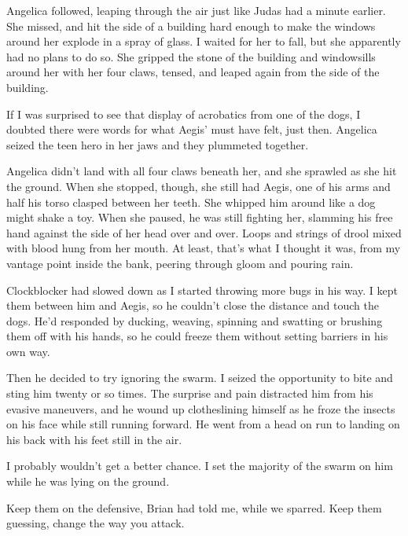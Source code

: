 Angelica followed, leaping through the air just like Judas had a minute earlier.  She missed, and hit the side of a building hard enough to make the windows around her explode in a spray of glass.  I waited for her to fall, but she apparently had no plans to do so.  She gripped the stone of the building and windowsills around her with her four claws, tensed, and leaped again from the side of the building.



If I was surprised to see that display of acrobatics from one of the dogs, I doubted there were words for what Aegis' must have felt, just then.  Angelica seized the teen hero in her jaws and they plummeted together.



Angelica didn't land with all four claws beneath her, and she sprawled as she hit the ground.  When she stopped, though, she still had Aegis, one of his arms and half his torso clasped between her teeth.  She whipped him around like a dog might shake a toy.  When she paused, he was still fighting her, slamming his free hand against the side of her head over and over.  Loops and strings of drool mixed with blood hung from her mouth.  At least, that's what I thought it was, from my vantage point inside the bank, peering through gloom and pouring rain.



Clockblocker had slowed down as I started throwing more bugs in his way.  I kept them between him and Aegis, so he couldn't close the distance and touch the dogs.  He'd responded by ducking, weaving, spinning and swatting or brushing them off with his hands, so he could freeze them without setting barriers in his own way.



Then he decided to try ignoring the swarm.  I seized the opportunity to bite and sting him twenty or so times.  The surprise and pain distracted him from his evasive maneuvers, and he wound up clotheslining himself as he froze the insects on his face while still running forward.  He went from a head on run to landing on his back with his feet still in the air.



I probably wouldn't get a better chance.  I set the majority of the swarm on him while he was lying on the ground.



Keep them on the defensive, Brian had told me, while we sparred.  Keep them guessing, change the way you attack.




